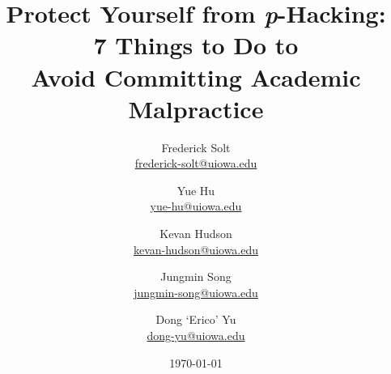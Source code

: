 \documentclass[12pt]{article}
\begin{document}
\title{Protect Yourself from {\textit p}-Hacking:\\ 7 Things to Do to\\ Avoid Committing Academic Malpractice}		
\author{
    Frederick Solt\\
    \href{mailto:frederick-solt@uiowa.edu}{frederick-solt@uiowa.edu}
    \and
    Yue Hu\\
    \href{mailto:yue-hu@uiowa.edu}{yue-hu@uiowa.edu}
    \and
	Kevan Hudson\\
	\href{mailto:kevan-hudson@uiowa.edu}{kevan-hudson@uiowa.edu}
	\and
	Jungmin Song\\
    \href{mailto:jungmin-song@uiowa.edu}{jungmin-song@uiowa.edu}
	\and
	Dong `Erico' Yu\\
    \href{mailto:dong-yu@uiowa.edu}{dong-yu@uiowa.edu}
}
\date{\today}				
\maketitle

\newpage


% 
% 
% 
% 
% 
% 
% 
% 

\newpage
\pagebreak



\end{document}
